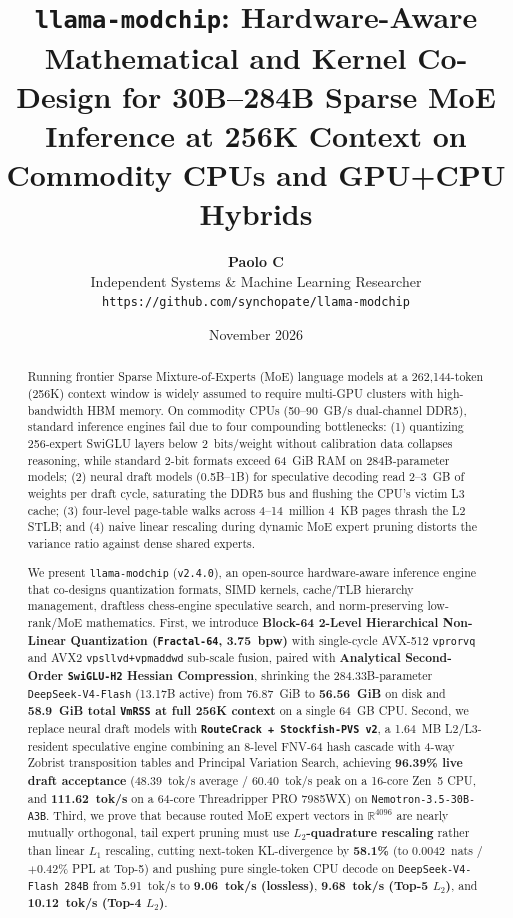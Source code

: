 \documentclass[10pt,twocolumn]{article}
\title{\textbf{\Large \texttt{llama-modchip}: Hardware-Aware Mathematical and Kernel Co-Design for 30B--284B Sparse MoE Inference at 256K Context on Commodity CPUs and GPU+CPU Hybrids}}
\author{
  \textbf{Paolo C} \\
  Independent Systems \& Machine Learning Researcher \\
  \texttt{https://github.com/synchopate/llama-modchip}
}
\date{November 2026}
\begin{document}
\maketitle

\begin{abstract}
Running frontier Sparse Mixture-of-Experts (MoE) language models at a 262,144-token (256K) context window is widely assumed to require multi-GPU clusters with high-bandwidth HBM memory. On commodity CPUs (50--90~GB/s dual-channel DDR5), standard inference engines fail due to four compounding bottlenecks: (1) quantizing 256-expert SwiGLU layers below 2~bits/weight without calibration data collapses reasoning, while standard 2-bit formats exceed 64~GiB RAM on 284B-parameter models; (2) neural draft models (0.5B--1B) for speculative decoding read 2--3~GB of weights per draft cycle, saturating the DDR5 bus and flushing the CPU's victim L3 cache; (3) four-level page-table walks across 4--14~million 4~KB pages thrash the L2 STLB; and (4) naive linear rescaling during dynamic MoE expert pruning distorts the variance ratio against dense shared experts.

We present \texttt{llama-modchip} (\texttt{v2.4.0}), an open-source hardware-aware inference engine that co-designs quantization formats, SIMD kernels, cache/TLB hierarchy management, draftless chess-engine speculative search, and norm-preserving low-rank/MoE mathematics. First, we introduce \textbf{Block-64 2-Level Hierarchical Non-Linear Quantization (\texttt{Fractal-64}, 3.75~bpw)} with single-cycle AVX-512 \texttt{vprorvq} and AVX2 \texttt{vpsllvd+vpmaddwd} sub-scale fusion, paired with \textbf{Analytical Second-Order \texttt{SwiGLU-H2} Hessian Compression}, shrinking the 284.33B-parameter \texttt{DeepSeek-V4-Flash} (13.17B active) from 76.87~GiB to \textbf{56.56~GiB} on disk and \textbf{58.9~GiB total \texttt{VmRSS} at full 256K context} on a single 64~GB CPU. Second, we replace neural draft models with \textbf{\texttt{RouteCrack + Stockfish-PVS v2}}, a 1.64~MB L2/L3-resident speculative engine combining an 8-level FNV-64 hash cascade with 4-way Zobrist transposition tables and Principal Variation Search, achieving \textbf{96.39\% live draft acceptance} (48.39~tok/s average / 60.40~tok/s peak on a 16-core Zen~5 CPU, and \textbf{111.62~tok/s} on a 64-core Threadripper PRO 7985WX) on \texttt{Nemotron-3.5-30B-A3B}. Third, we prove that because routed MoE expert vectors in $\mathbb{R}^{4096}$ are nearly mutually orthogonal, tail expert pruning must use \textbf{$L_2$-quadrature rescaling} rather than linear $L_1$ rescaling, cutting next-token KL-divergence by \textbf{58.1\%} (to 0.0042~nats / $+0.42\%$ PPL at Top-5) and pushing pure single-token CPU decode on \texttt{DeepSeek-V4-Flash 284B} from 5.91~tok/s to \textbf{9.06~tok/s (lossless)}, \textbf{9.68~tok/s (Top-5 $L_2$)}, and \textbf{10.12~tok/s (Top-4 $L_2$)}.
\end{abstract}
\end{document}
